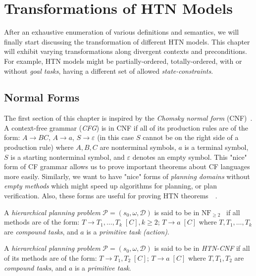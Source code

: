 \chapter{Transformations of {HTN} {M}odels}

\medskip\noindent
After an exhaustive enumeration of various definitions and semantics, we will finally start discussing the transformation of different HTN models. This chapter will exhibit varying transformations along divergent contexts and preconditions. For example, HTN models might be partially-ordered, totally-ordered, with or without \emph{goal tasks}, having a different set of allowed \emph{state-constraints}.

\section{Normal Forms}

\medskip\noindent
The first section of this chapter is inspired by the \emph{Chomsky normal form} (CNF)~\cite{chytil}. A context-free grammar (\emph{CFG}) is in CNF if all of its production rules are of the form: $A \rightarrow BC$, $A \rightarrow a$, $S \rightarrow \varepsilon$ (in this case $S$ cannot be on the right side of a production rule) where $A, B, C$ are nonterminal symbols, $a$ is a terminal symbol, $S$ is a starting nonterminal symbol, and $\varepsilon$ denotes an empty symbol. This "nice" form of CF grammar allows us to prove important theorems about CF languages more easily. Similarly, we want to have "nice" forms of \emph{planning domains} without \emph{empty methods} which might speed up algorithms for planning, or plan verification. Also, these forms are useful for proving HTN theorems~\cite{langclassification}~\cite{cmyk}.

\begin{defn}\label{def04:14}
    A \emph{hierarchical planning problem} $\mathcal{P} = (s_0,\omega,\mathcal{D})$ is said to be in $\text{NF}_{\geq 2}$~\cite{langclassification} if all methods are of the form: $T \rightarrow T_1, \dots, T_k \; [C], k \geq 2$; $T \rightarrow a \; [C]$ where $T, T_1, \dots, T_k$ are \emph{compound tasks}, and $a$ is a \emph{primitive task (action)}.
\end{defn}

\begin{defn}\label{def04:15}
    A \emph{hierarchical planning problem} $\mathcal{P} = (s_0,\omega,\mathcal{D})$ is said to be in \emph{HTN-CNF} if all of its methods are of the form: $T \rightarrow T_1, T_2 \; [C]$; $T \rightarrow a \; [C]$ where $T, T_1, T_2$ are \emph{compound tasks}, and $a$ is a \emph{primitive task}. 
\end{defn}


